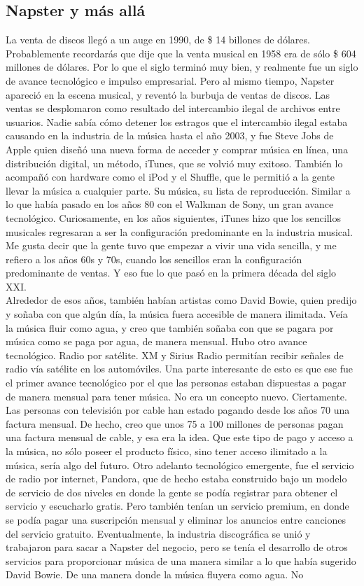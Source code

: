 \documentclass[10pt]{book}
\begin{document}
\subsection{Napster y más allá}
La venta de discos llegó a un auge en 1990, de \$ 14 billones de dólares. Probablemente recordarás que dije que la venta musical en 1958 era de sólo \$ 604 millones de dólares. Por lo que el siglo terminó muy bien, y realmente fue un siglo de avance tecnológico e impulso empresarial. Pero al mismo tiempo, Napster apareció  en la escena musical, y reventó la burbuja de ventas de discos. Las ventas se desplomaron como resultado  del intercambio ilegal de archivos entre usuarios. Nadie sabía cómo detener los estragos que el intercambio ilegal estaba causando en la industria de la música hasta el año 2003, y fue Steve Jobs de Apple quien diseñó una nueva forma de acceder y comprar música en línea,   una distribución digital, un método, iTunes, que se volvió muy exitoso. También lo acompañó con hardware como el iPod y el Shuffle, que le permitió a la gente llevar la música a cualquier parte. Su música, su lista de reproducción.  Similar a lo que había pasado en los años 80 con el Walkman de Sony, un gran avance tecnológico. Curiosamente, en los años siguientes, iTunes hizo que los sencillos musicales regresaran a ser la configuración predominante en la industria musical. Me gusta decir que la gente tuvo que empezar  a vivir una vida sencilla, y me refiero a los años 60s y 70s, cuando los sencillos eran la configuración predominante de ventas. Y eso fue lo que pasó  en la primera década del siglo XXI.\\ Alrededor de esos años, también habían artistas como David Bowie, quien predijo y soñaba con que algún día, la música fuera  accesible de manera ilimitada. Veía la música fluir como agua, y creo que también soñaba con que se pagara por música como se paga por agua, de manera mensual. Hubo otro avance tecnológico. Radio por satélite. XM y Sirius Radio permitían recibir señales de radio vía satélite en los automóviles. Una parte interesante de esto es que ese fue el primer avance tecnológico por el que las personas estaban dispuestas a pagar de manera mensual para tener música. No era un concepto nuevo. Ciertamente. Las personas con televisión por cable han estado pagando desde los años 70 una factura mensual. De hecho, creo que unos 75 a 100 millones de personas pagan una factura mensual de cable, y esa era la idea. Que este tipo de pago y acceso a la música, no sólo poseer el producto físico, sino tener acceso ilimitado a la música, sería algo del futuro. Otro adelanto tecnológico emergente, fue el servicio de radio por internet, Pandora, que de hecho estaba construido bajo un modelo de servicio de dos niveles en donde la gente se podía registrar  para obtener el servicio y escucharlo gratis. Pero también tenían un servicio premium,  en donde se podía pagar una suscripción mensual y eliminar los anuncios entre canciones del servicio gratuito. Eventualmente, la industria discográfica se unió y trabajaron para sacar a Napster del negocio, pero se tenía el desarrollo de otros servicios para proporcionar música de una manera similar a lo que había sugerido David Bowie. De una manera donde la música fluyera como agua. No 
\end{document}

